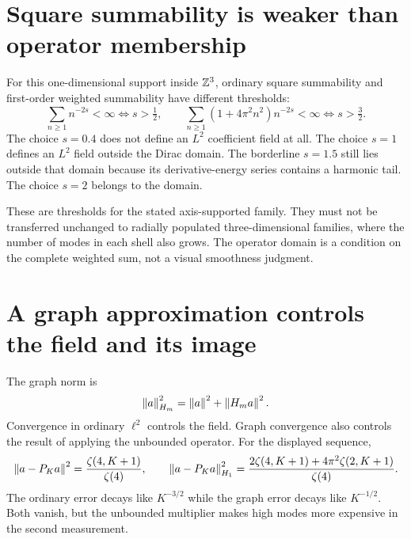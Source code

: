 \section{Square summability is weaker than operator membership}

For this one-dimensional support inside $\mathbb Z^3$, ordinary square summability and first-order weighted summability have different thresholds:
\[
\sum_{n\geq1}n^{-2s}<\infty\iff s>\tfrac12,
\qquad
\sum_{n\geq1}(1+4\pi^2n^2)n^{-2s}<\infty
\iff s>\tfrac32.
\]
The choice $s=0.4$ does not define an $L^2$ coefficient field at all. The choice $s=1$ defines an $L^2$ field outside the Dirac domain. The borderline $s=1.5$ still lies outside that domain because its derivative-energy series contains a harmonic tail. The choice $s=2$ belongs to the domain.

These are thresholds for the stated axis-supported family. They must not be transferred unchanged to radially populated three-dimensional families, where the number of modes in each shell also grows. The operator domain is a condition on the complete weighted sum, not a visual smoothness judgment.


\clearpage
\section{A graph approximation controls the field and its image}

The graph norm is
\[
\left\lVert a\right\rVert_{H_m}^2=\left\lVert a\right\rVert^2+\left\lVert H_ma\right\rVert^2.
\]
Convergence in ordinary $\ell^2$ controls the field. Graph convergence also controls the result of applying the unbounded operator. For the displayed sequence,
\[
\left\lVert a-P_Ka\right\rVert^2=\frac{\zeta(4,K+1)}{\zeta(4)},\qquad
\left\lVert a-P_Ka\right\rVert_{H_1}^2=
\frac{2\zeta(4,K+1)+4\pi^2\zeta(2,K+1)}{\zeta(4)}.
\]
The ordinary error decays like $K^{-3/2}$ while the graph error decays like $K^{-1/2}$. Both vanish, but the unbounded multiplier makes high modes more expensive in the second measurement.

